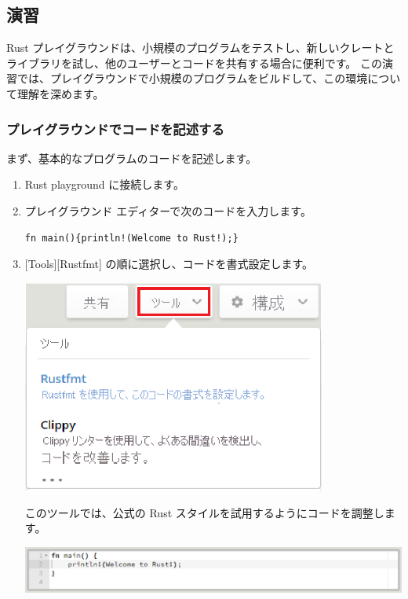 \subsection{演習}

Rust プレイグラウンドは、小規模のプログラムをテストし、新しいクレートとライブラリを試し、他のユーザーとコードを共有する場合に便利です。 この演習では、プレイグラウンドで小規模のプログラムをビルドして、この環境について理解を深めます。

\subsubsection{プレイグラウンドでコードを記述する}

まず、基本的なプログラムのコードを記述します。

\begin{enumerate}
\item Rust playground に接続します。

\item プレイグラウンド エディターで次のコードを入力します。

\begin{lstlisting}[numbers=none]
fn main(){println!(Welcome to Rust!);}
\end{lstlisting}

\item $[$Tools][Rustfmt] の順に選択し、コードを書式設定します。

\includegraphics[width=10cm]{rust-playground-tools.eps}

このツールでは、公式の Rust スタイルを試用するようにコードを調整します。

\includegraphics[width=14cm]{rust-playground-rustfmt.eps}


\end{enumerate}
